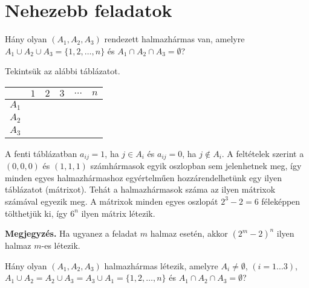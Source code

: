 \section*{Nehezebb feladatok}
\begin{extraproblem}
	Hány olyan $(A_{1},A_{2},A_{3})$ rendezett halmazhármas van, amelyre
	$A_{1}\cup A_{2}\cup A_{3}=\{1,2,\dots,n\}$ és $A_{1}\cap A_{2}\cap A_{3}=\emptyset$? 
\end{extraproblem}
\begin{solution}
	Tekintsük az alábbi táblázatot. 
	\begin{center}
		\begin{tabular}{|c|c|c|c|c|c|}
			\hline 
			& $1$ & $2$ & $3$ & $\dots$ & $n$\tabularnewline
			\hline 
			$A_{1}$ &  &  &  &  & \tabularnewline
			\hline 
			$A_{2}$ &  &  &  &  & \tabularnewline
			\hline 
			$A_{3}$ &  &  &  &  & \tabularnewline
			\hline 
		\end{tabular}
		\par\end{center}
	A fenti táblázatban $a_{ij}=1$, ha $j\in A_{i}$ és $a_{ij}=0$,
	ha $j\notin A_{i}$. A feltételek szerint a $(0,0,0)$ és $(1,1,1)$
	számhármasok egyik oszlopban sem jelenhetnek meg, így minden egyes
	halmazhármashoz egyértelműen hozzárendelhetünk egy ilyen táblázatot
	(mátrixot). Tehát a halmazhármasok száma az ilyen mátrixok számával
	egyezik meg. A mátrixok minden egyes oszlopát $2^{3}-2=6$ féleképpen
	tölthetjük ki, így $6^{n}$ ilyen mátrix létezik.
	
	\textbf{Megjegyzés.} Ha ugyanez a feladat $m$ halmaz esetén, akkor
	$(2^{m}-2)^{n}$ ilyen halmaz $m$-es létezik.
\end{solution}
\begin{extraproblem}
	Hány olyan $(A_{1},A_{2},A_{3})$ halmazhármas létezik, amelyre $A_{i}\neq\emptyset$,
	$(i=1\dots3)$, $A_{1}\cup A_{2}=A_{2}\cup A_{3}=A_{3}\cup A_{1}=\{1,2,\dots,n\}$
	és $A_{1}\cap A_{2}\cap A_{3}=\emptyset$? 
\end{extraproblem}
